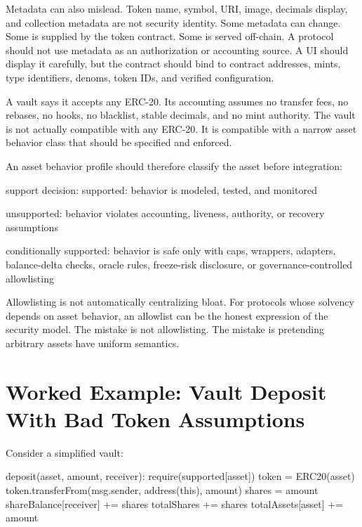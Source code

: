 Metadata can also mislead. Token name, symbol, URI, image, decimals display, and collection metadata are not security identity. Some metadata can change. Some is supplied by the token contract. Some is served off-chain. A protocol should not use metadata as an authorization or accounting source. A UI should display it carefully, but the contract should bind to contract addresses, mints, type identifiers, denoms, token IDs, and verified configuration.

\begin{failuremodebox}
A vault says it accepts any ERC-20. Its accounting assumes no transfer fees, no rebases, no hooks, no blacklist, stable decimals, and no mint authority. The vault is not actually compatible with any ERC-20. It is compatible with a narrow asset behavior class that should be specified and enforced.
\end{failuremodebox}

An asset behavior profile should therefore classify the asset before integration:

\begin{codeblock}
support decision:
    supported:
        behavior is modeled, tested, and monitored

    unsupported:
        behavior violates accounting, liveness, authority, or recovery assumptions

    conditionally supported:
        behavior is safe only with caps, wrappers, adapters, balance-delta checks,
        oracle rules, freeze-risk disclosure, or governance-controlled allowlisting
\end{codeblock}

Allowlisting is not automatically centralizing bloat. For protocols whose solvency depends on asset behavior, an allowlist can be the honest expression of the security model. The mistake is not allowlisting. The mistake is pretending arbitrary assets have uniform semantics.

\section{Worked Example: Vault Deposit With Bad Token Assumptions}

Consider a simplified vault:

\begin{codeblock}
deposit(asset, amount, receiver):
    require(supported[asset])
    token = ERC20(asset)
    token.transferFrom(msg.sender, address(this), amount)
    shares = amount
    shareBalance[receiver] += shares
    totalShares += shares
    totalAssets[asset] += amount
\end{codeblock}

